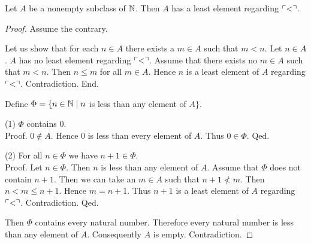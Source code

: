 \documentclass[../arithmetic.tex]{subfiles}
\begin{document}
  \begin{forthel}
    \begin{proposition}
      Let $A$ be a nonempty subclass of $\mathbb{N}$.
      Then $A$ has a least element regarding $\ulcorner<\urcorner$.
    \end{proposition}
    \begin{proof}
      Assume the contrary.

      Let us show that for each $n \in A$ there exists a $m \in A$ such that
      $m \less n$.
        Let $n \in A$.
        $A$ has no least element regarding $\ulcorner<\urcorner$.
        Assume that there exists no $m \in A$ such that $m \less n$.
        Then $n \leq m$ for all $m \in A$.
        Hence $n$ is a least element of $A$ regarding $\ulcorner<\urcorner$.
        Contradiction.
      End.

      Define $\Phi = \{ n \in \mathbb{N} \mid n$ is less than any element of $A \}$.

      (1) $\Phi$ contains $0$. \\
      Proof.
        $0 \notin A$.
        Hence $0$ is less than every element of $A$.
        Thus $0 \in \Phi$.
      Qed.

      (2) For all $n \in \Phi$ we have $n \plus 1 \in \Phi$. \\
      Proof.
        Let $n \in \Phi$.
        Then $n$ is less than any element of $A$.
        Assume that $\Phi$ does not contain $n \plus 1$.
        Then we can take an $m \in A$ such that $n \plus 1 \nless m$.
        Then $n \less m \leq n \plus 1$.
        Hence $m = n \plus 1$.
        Thus $n \plus 1$ is a least element of $A$ regarding $\ulcorner<\urcorner$.
        Contradiction.
      Qed.

      Then $\Phi$ contains every natural number.
      Therefore every natural number is less than any element of $A$.
      Consequently $A$ is empty.
      Contradiction.
    \end{proof}
  \end{forthel}
\end{document}
